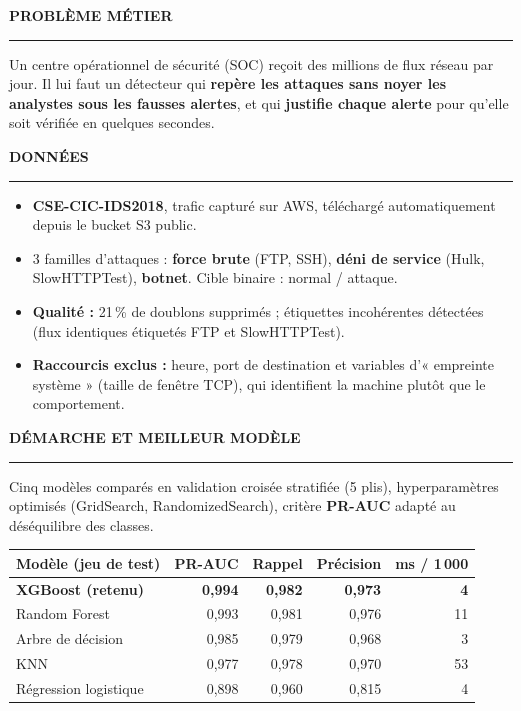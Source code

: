 \documentclass[10pt,a4paper]{article}
\newcommand{\rubrique}[1]{%
  \vspace{4pt}%
  {\color{orange}\bfseries\small\MakeUppercase{#1}}\par\vspace{-3pt}%
  {\color{trait}\rule{\linewidth}{0.5pt}}\par\vspace{1pt}}
\begin{document}
\noindent
\begin{minipage}[t]{0.485\linewidth}

\rubrique{Problème métier}
Un centre opérationnel de sécurité (SOC) reçoit des millions de flux réseau par jour. Il lui faut un détecteur
qui \textbf{repère les attaques sans noyer les analystes sous les fausses alertes}, et qui
\textbf{justifie chaque alerte} pour qu'elle soit vérifiée en quelques secondes.

\rubrique{Données}
\begin{itemize}
  \item \textbf{CSE-CIC-IDS2018}, trafic capturé sur AWS, téléchargé automatiquement depuis le bucket S3 public.
  \item 3 familles d'attaques : \textbf{force brute} (FTP, SSH), \textbf{déni de service} (Hulk, SlowHTTPTest),
        \textbf{botnet}. Cible binaire : normal / attaque.
  \item \textbf{Qualité :} 21\,\% de doublons supprimés ; étiquettes incohérentes détectées (flux identiques
        étiquetés FTP et SlowHTTPTest).
  \item \textbf{Raccourcis exclus :} heure, port de destination et variables d'« empreinte système »
        (taille de fenêtre TCP), qui identifient la machine plutôt que le comportement.
\end{itemize}

\rubrique{Démarche et meilleur modèle}
Cinq modèles comparés en validation croisée stratifiée (5 plis), hyperparamètres optimisés (GridSearch,
RandomizedSearch), critère \textbf{PR-AUC} adapté au déséquilibre des classes.

\vspace{2pt}
{\fontsize{8}{10}\selectfont
\renewcommand{\arraystretch}{1.2}
\begin{tabularx}{\linewidth}{@{}Xrrrr@{}}
  \toprule
  \textcolor{gris}{\textbf{Modèle (jeu de test)}} & \textcolor{gris}{\textbf{PR-AUC}} &
  \textcolor{gris}{\textbf{Rappel}} & \textcolor{gris}{\textbf{Précision}} & \textcolor{gris}{\textbf{ms / 1\,000}} \\
  \midrule
  \rowcolor{fondligne} \textbf{XGBoost (retenu)} & \textbf{0,994} & \textbf{0,982} & \textbf{0,973} & \textbf{4} \\
  Random Forest         & 0,993 & 0,981 & 0,976 & 11 \\
  Arbre de décision     & 0,985 & 0,979 & 0,968 & 3 \\
  KNN                   & 0,977 & 0,978 & 0,970 & 53 \\
  Régression logistique & 0,898 & 0,960 & 0,815 & 4 \\
  \bottomrule
\end{tabularx}}


\end{minipage}
\end{document}
